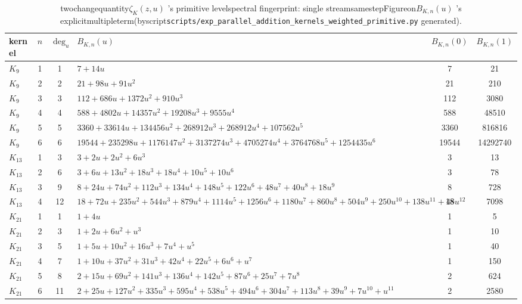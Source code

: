 \begin{table}[H]
\centering
\scriptsize
\setlength{\tabcolsep}{6pt}
\renewcommand{\arraystretch}{1.15}
\caption{twochangequantity$\zeta_K(z,u)$ 's  primitive levelspectral fingerprint: single streamsamestepFigureon$B_{K,n}(u)$ 's explicitmultipleterm(byscript\texttt{scripts/exp\_parallel\_addition\_kernels\_weighted\_primitive.py} generated).}
\label{tab:parallel-addition-kernels-weighted-primitive}
\begin{tabular}{@{}lccp{}cc@{}}
\toprule
kernel& $n$ & $\deg_u$ & $B_{K,n}(u)$ & $B_{K,n}(0)$ & $B_{K,n}(1)$ \\
\midrule
$K_{9}$ & 1 & 1 & $7+14u$ & 7 & 21 \\
$K_{9}$ & 2 & 2 & $21+98u+91u^{2}$ & 21 & 210 \\
$K_{9}$ & 3 & 3 & $112+686u+1372u^{2}+910u^{3}$ & 112 & 3080 \\
$K_{9}$ & 4 & 4 & $588+4802u+14357u^{2}+19208u^{3}+9555u^{4}$ & 588 & 48510 \\
$K_{9}$ & 5 & 5 & $3360+33614u+134456u^{2}+268912u^{3}+268912u^{4}+107562u^{5}$ & 3360 & 816816 \\
$K_{9}$ & 6 & 6 & $19544+235298u+1176147u^{2}+3137274u^{3}+4705274u^{4}+3764768u^{5}+1254435u^{6}$ & 19544 & 14292740 \\
$K_{13}$ & 1 & 3 & $3+2u+2u^{2}+6u^{3}$ & 3 & 13 \\
$K_{13}$ & 2 & 6 & $3+6u+13u^{2}+18u^{3}+18u^{4}+10u^{5}+10u^{6}$ & 3 & 78 \\
$K_{13}$ & 3 & 9 & $8+24u+74u^{2}+112u^{3}+134u^{4}+148u^{5}+122u^{6}+48u^{7}+40u^{8}+18u^{9}$ & 8 & 728 \\
$K_{13}$ & 4 & 12 & $18+72u+235u^{2}+544u^{3}+879u^{4}+1114u^{5}+1256u^{6}+1180u^{7}+860u^{8}+504u^{9}+250u^{10}+138u^{11}+48u^{12}$ & 18 & 7098 \\
$K_{21}$ & 1 & 1 & $1+4u$ & 1 & 5 \\
$K_{21}$ & 2 & 3 & $1+2u+6u^{2}+u^{3}$ & 1 & 10 \\
$K_{21}$ & 3 & 5 & $1+5u+10u^{2}+16u^{3}+7u^{4}+u^{5}$ & 1 & 40 \\
$K_{21}$ & 4 & 7 & $1+10u+37u^{2}+31u^{3}+42u^{4}+22u^{5}+6u^{6}+u^{7}$ & 1 & 150 \\
$K_{21}$ & 5 & 8 & $2+15u+69u^{2}+141u^{3}+136u^{4}+142u^{5}+87u^{6}+25u^{7}+7u^{8}$ & 2 & 624 \\
$K_{21}$ & 6 & 11 & $2+25u+127u^{2}+335u^{3}+595u^{4}+538u^{5}+494u^{6}+304u^{7}+113u^{8}+39u^{9}+7u^{10}+u^{11}$ & 2 & 2580 \\
\bottomrule
\end{tabular}
\end{table}
